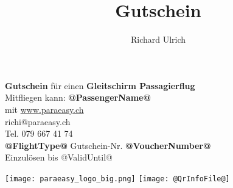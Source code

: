 \documentclass[a5paper, landscape, pagenumber=no]{scrartcl}
\begin{document}
\author{Richard Ulrich}
\title{Gutschein}


\begin{center}
\raggedleft
{\huge\textbf{Gutschein}} für einen {\huge\textbf{Gleitschirm Passagierflug}}\\
Mitfliegen kann: {\LARGE \textbf{@PassengerName@}}\\
mit \url{www.paraeasy.ch}\\
richi@paraeasy.ch\\
Tel. 079 667 41 74\\
\textbf{@FlightType@} Gutschein-Nr. \textbf{@VoucherNumber@}\\
Einzulösen bis @ValidUntil@\\
\end{center}

\texttt{[image: paraeasy\_logo\_big.png]} 
\texttt{[image: @QrInfoFile@]} 
\end{document}

